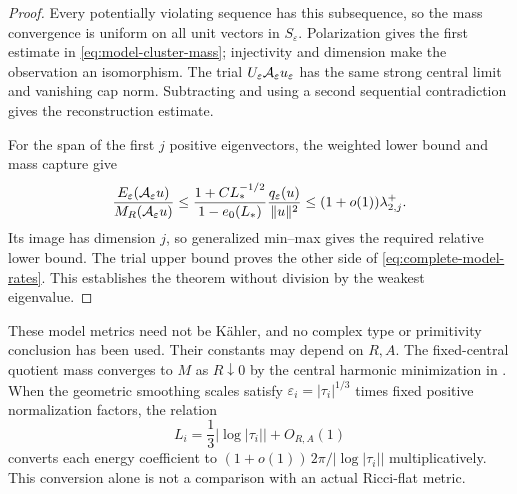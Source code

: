 \begin{proof}
Every potentially violating sequence has this subsequence, so the
mass convergence is uniform on all unit vectors in $S_\varepsilon$.
Polarization gives the first estimate in
\eqref{eq:model-cluster-mass}; injectivity and dimension make the
observation an isomorphism. The trial
$U_\varepsilon\mathcal A_\varepsilon u_\varepsilon$ has the same strong
central limit and vanishing cap norm. Subtracting and using a
second sequential contradiction gives the reconstruction estimate.

For the span of the first $j$ positive eigenvectors, the weighted
lower bound and mass capture give
\[
 \frac{E_\varepsilon(\mathcal A_\varepsilon u)}
          {M_R(\mathcal A_\varepsilon u)}
       \le
       \frac{1+CL_*^{-1/2}}{1-e_0(L_*)}
       \frac{q_\varepsilon(u)}{\|u\|^2}
       \le(1+o(1))\lambda^+_{2,j}.
\]
Its image has dimension $j$, so generalized min--max gives the
required relative lower bound. The trial upper bound proves the
other side of \eqref{eq:complete-model-rates}. This establishes
the theorem without division by the weakest eigenvalue.
\end{proof}

These model metrics need not be Kähler, and no complex type or
primitivity conclusion has been used. Their constants may depend on
$R,A$. The fixed-central quotient mass converges to $M$ as $R\downarrow0$
by the central harmonic minimization in \cite[Section~5]{wuebben-hodge}.
When the geometric smoothing scales satisfy
$\varepsilon_i=|\tau_i|^{1/3}$ times fixed positive normalization
factors, the relation
\[
 L_i=\frac13|\log|\tau_i||+O_{R,A}(1)
\]
converts each energy coefficient to
$(1+o(1))\,2\pi/|\log|\tau_i||$ multiplicatively. This conversion
alone is not a comparison with an actual Ricci-flat metric.
